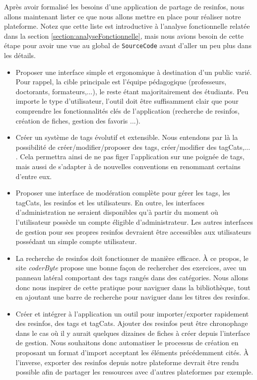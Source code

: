 Après avoir formalisé les besoins d'une application de partage de \glspl{resinfo}, nous allons maintenant lister ce que nous allons mettre en place pour réaliser notre plateforme. Notez que cette liste est introductive à l'analyse fonctionnelle relatée dans la section \ref{section:analyseFonctionnelle}, mais nous avions besoin de cette étape pour avoir une vue au global de \texttt{SourceCode} avant d'aller un peu plus dans les détails.

\begin{itemize}
    \item Proposer une interface simple et ergonomique à destination d'un public varié. Pour rappel, la cible principale est l'équipe pédagogique (professeurs, doctorants, formateurs,...), le reste étant majoritairement des étudiants. Peu importe le type d'utilisateur, l'outil doit être suffisamment clair que pour comprendre les fonctionnalités clés de l'application (recherche de \glspl{resinfo}, création de \glspl{fiche}, gestion des favoris ...).
    \item Créer un système de \glspl{tag} évolutif et extensible. Nous entendons par là la possibilité de créer/modifier/proposer des \glspl{tag}, créer/modifier des \glspl{tagCat},... . Cela permettra ainsi de ne pas figer l'application sur une poignée de \glspl{tag}, mais aussi de s'adapter à de nouvelles conventions en renommant certains d'entre eux.
    \item Proposer une interface de modération complète pour gérer les \glspl{tag}, les \glspl{tagCat}, les \glspl{resinfo} et les utilisateurs. En outre, les interfaces d'administration ne seraient disponibles qu'à partir du moment où l'utilisateur possède un compte éligible d'administrateur. Les autres interfaces de gestion pour ses propres \glspl{resinfo} devraient être accessibles aux utilisateurs possédant un simple compte utilisateur.
    \item La recherche de \glspl{resinfo} doit fonctionner de manière efficace. À ce propos, le site \textit{coderByte} propose une bonne façon de rechercher des exercices, avec un panneau latéral comportant des \glspl{tag} rangés dans des catégories. Nous allons donc nous inspirer de cette pratique pour naviguer dans la bibliothèque, tout en ajoutant une barre de recherche pour naviguer dans les titres des \glspl{resinfo}.
    \item Créer et intégrer à l'application un outil pour importer/exporter rapidement des \glspl{resinfo}, des \glspl{tag} et \glspl{tagCat}. Ajouter des \glspl{resinfo} peut être chronophage dans le cas où il y aurait quelques dizaines de \glspl{fiche} à créer depuis l'interface de gestion. Nous souhaitons donc automatiser le processus de création en proposant un format d'import acceptant les éléments précédemment cités. À l'inverse, exporter des \glspl{resinfo} depuis notre plateforme devrait être rendu possible afin de partager les ressources avec d'autres plateformes par exemple.

\end{itemize}
